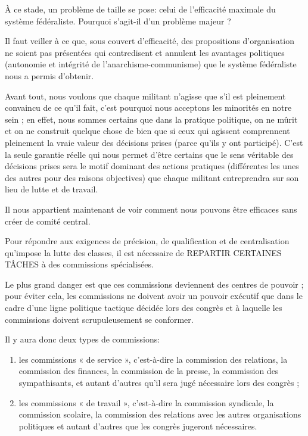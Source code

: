 À ce stade, un problème de taille se pose: celui de l'efficacité maximale du système fédéraliste. Pourquoi s'agit-il d'un problème majeur ?

Il faut veiller à ce que, sous couvert d'efficacité, des propositions d'organisation ne soient pas présentées qui contredisent et annulent les avantages politiques (autonomie et intégrité de l'anarchisme-communisme) que le système fédéraliste nous a permis d'obtenir.

Avant tout, nous voulons que chaque militant n'agisse que s'il est pleinement convaincu de ce qu'il fait, c'est pourquoi nous acceptons les minorités en notre sein ; en effet, nous sommes certains que dans la pratique politique, on ne mûrit et on ne construit quelque chose de bien que si ceux qui agissent comprennent pleinement la vraie valeur des décisions prises (parce qu'ils y ont participé). C'est la seule garantie réelle qui nous permet d'être certains que le sens véritable des décisions prises sera le motif dominant des actions pratiques (différentes les unes des autres pour des raisons objectives) que chaque militant entreprendra sur son lieu de lutte et de travail.

Il nous appartient maintenant de voir comment nous pouvons être efficaces sans créer de comité central.

Pour répondre aux exigences de précision, de qualification et de centralisation qu'impose la lutte des classes, il est nécessaire de REPARTIR CERTAINES TÂCHES à des commissions spécialisées.

Le plus grand danger est que ces commissions deviennent des centres de pouvoir ; pour éviter cela, les commissions ne doivent avoir un pouvoir exécutif que dans le cadre d'une ligne politique tactique décidée lors des congrès et à laquelle les commissions doivent scrupuleusement se conformer.

Il y aura donc deux types de commissions:

\begin{enumerate}
\item{} les commissions « de service », c'est-à-dire la commission des relations, la commission des finances, la commission de la presse, la commission des sympathisants, et autant d'autres qu'il sera jugé nécessaire lors des congrès ;
\item{} les commissions « de travail », c'est-à-dire la commission syndicale, la commission scolaire, la commission des relations avec les autres organisations politiques et autant d'autres que les congrès jugeront nécessaires.
\end{enumerate}

